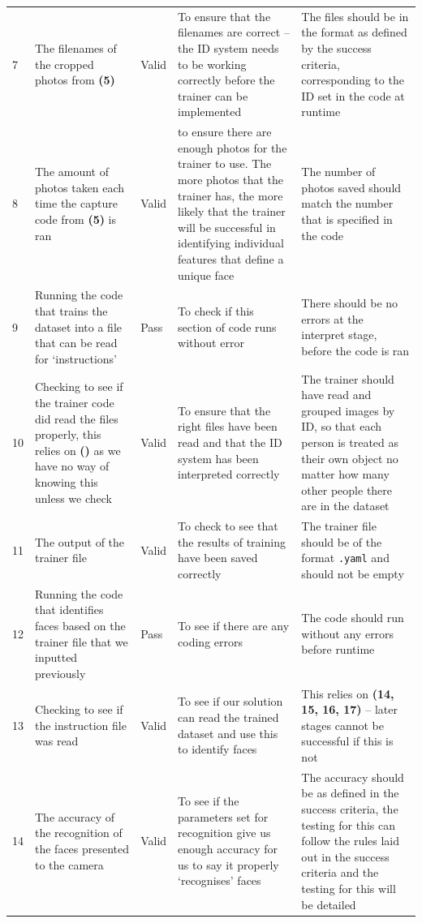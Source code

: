 \documentclass[9pt]{article}
\begin{document}
\begin{tabularx}{\textwidth}{lXlXX}
	7   & The filenames of the cropped photos from \textbf{(5)} & Valid & To ensure that the filenames are correct -- the ID system needs to be working correctly before the trainer can be implemented & The files should be in the format as defined by the success criteria, corresponding to the ID set in the code at runtime \\
	8   & The amount of photos taken each time the capture code from \textbf{(5)} is ran & Valid & to ensure there are enough photos for the trainer to use. The more photos that the trainer has, the more likely that the trainer will be successful in identifying individual features that define a unique face &  The number of photos saved should match the number that is specified in the code \\
	9   & Running the code that trains the dataset into a file that can be read for `instructions' & Pass & To check if this section of code runs without error & There should be no errors at the interpret stage, before the code is ran \\
	10  & Checking to see if the trainer code did read the files properly, this relies on \textbf{()} as we have no way of knowing this unless we check & Valid & To ensure that the right files have been read and that the ID system has been interpreted correctly & The trainer should have read and grouped images by ID, so that each person is treated as their own object no matter how many other people there are in the dataset\\
	11  & The output of the trainer file & Valid & To check to see that the results of training have been saved correctly & The trainer file should be of the format \texttt{.yaml} and should not be empty \\
	12  & Running the code that identifies faces based on the trainer file that we inputted previously & Pass & To see if there are any coding errors & The code should run without any errors before runtime \\
	13  & Checking to see if the instruction file was read & Valid & To see if our solution can read the trained dataset and use this to identify faces & This relies on \textbf{(14, 15, 16, 17)} -- later stages cannot be successful if this is not \\
	14  & The accuracy of the recognition of the faces presented to the camera & Valid & To see if the parameters set for recognition give us enough accuracy for us to say it properly `recognises' faces & The accuracy should be as defined in the success criteria, the testing for this can follow the rules laid out in the success criteria and the testing for this will be detailed \\ 

\end{tabularx}
\end{document}
